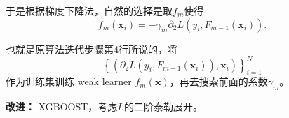 
\begin{frame}

于是根据梯度下降法，自然的选择是取$f_m$使得
\[f_m(\mathbf{x}_i) = -\gamma_m \partial_2 L(y_i, F_{m-1}(\mathbf{x}_i)).\]

也就是原算法迭代步骤第4行所说的，将
\[\left\{(\partial_2 L(y_i, F_{m-1}(\mathbf{x}_i)), \mathbf{x}_i) \right\}_{i=1}^N\]
作为训练集训练 weak learner $f_m(\mathbf{x})$，再去搜索前面的系数$\gamma_m$。

\vspace{2em}
\pause

{\bfseries 改进：} XGBOOST，考虑$L$的二阶泰勒展开。

\end{frame}














